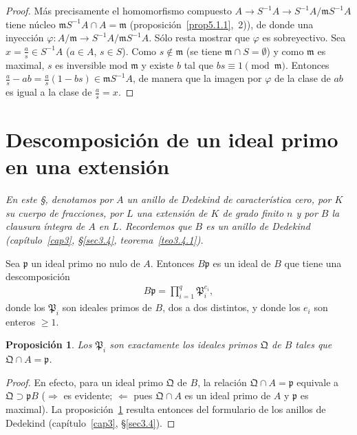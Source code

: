 \documentclass[10pt,oneside,bibtotoc,smallheadings,leqno,a5paper,DIV=12]{scrbook}
\newcommand{\idl}[1]{\mathfrak{#1}}
\newcommand{\QED}{}%
\renewcommand{\to}[1][]{\xrightarrow{#1}}
\numberwithin{equation}{section}
\theoremstyle{defi}
\theoremstyle{enonce}
\newtheorem{proposition}{Proposici\'on}
\theoremstyle{rem}
\numberwithin{theorem}{section}
\numberwithin{proposition}{section}
\numberwithin{definition}{section}
\numberwithin{lemma}{section}
\numberwithin{corollary}{section}
\numberwithin{example}{section}
\numberwithin{footnote}{section}%
\begin{document}
\begin{proof}
M\'as precisamente el homomorfismo compuesto $A\to S^{-1}A\to S^{-1}A/\idl{m}S^{-1}A$ tiene n\'ucleo
$\idl{m}S^{-1}A\cap A=\idl{m}$ (proposici\'on~\ref{prop5.1.1},~2)),
de donde una inyecci\'on $\varphi:A/\idl{m}\to S^{-1}A/\idl{m}S^{-1}A$.
S\'olo resta mostrar que $\varphi$ es sobreyectivo. Sea $x = \frac{a}{s}\in S^{-1}A$ ($a\in A$, $s\in S$). Como
$s\notin\idl{m}$ (se tiene $\idl{m}\cap S=\emptyset$) y como $\idl{m}$ es maximal, $s$ es inversible mod $\idl{m}$
y existe $b$ tal que $bs\equiv 1\pmod\idl{m}$. Entonces $\frac{a}{s}-ab=\frac{a}{s}(1-bs)\in\idl{m}S^{-1}A$,
de manera que la imagen por $\varphi$ de la clase de $ab$ es igual a la clase de $\frac{a}{s} = x$. \QED
\end{proof}

\section{Descomposici\'on de un ideal primo en una extensi\'on}\label{sec5.2}

\begin{trivlist}
\item\textit{En este \S, denotamos por $A$ un anillo de Dedekind de caracter\'istica cero, por $K$ su cuerpo
de fracciones, por $L$ una extensi\'on de $K$ de grado finito $n$ y por $B$ la clausura \'integra de $A$ en $L$.
Recordemos que $B$ es un anillo de Dedekind (cap\'itulo~\ref{cap3}, \S\ref{sec3.4}, teorema~\ref{teo3.4.1}).}
\end{trivlist}

Sea $\idl{p}$ un ideal primo no nulo de $A$. Entonces $B\idl{p}$ es un ideal de $B$ que tiene una descomposici\'on
\begin{gather}\label{eq-5.2-1}
B\idl{p} = \prod_{i=1}^{q}\idl{P}_{i}^{e_{i}},
\end{gather}
donde los $\idl{P}_{i}$ son ideales primos de $B$, dos a dos distintos, y donde los $e_{i}$ son enteros $\geq 1$.

\begin{proposition}\label{prop5.2.1}
Los $\idl{P}_{i}$ son exactamente los ideales primos $\idl{Q}$ de $B$ tales que $\idl{Q}\cap A=\idl{p}$.
\end{proposition}

\begin{proof}
En efecto, para un ideal primo $\idl{Q}$ de $B$, la relaci\'on $\idl{Q}\cap A=\idl{p}$ equivale a
$\idl{Q}\supset\idl{p}B$ ($\Rightarrow$ es evidente; $\Leftarrow$ pues $\idl{Q}\cap A$ es un ideal primo de
$A$ y $\idl{p}$ es maximal). La proposici\'on~\ref{prop5.2.1} resulta entonces del formulario de los anillos de Dedekind
(cap\'itulo~\ref{cap3}, \S\ref{sec3.4}).
\end{proof}
\end{document}
